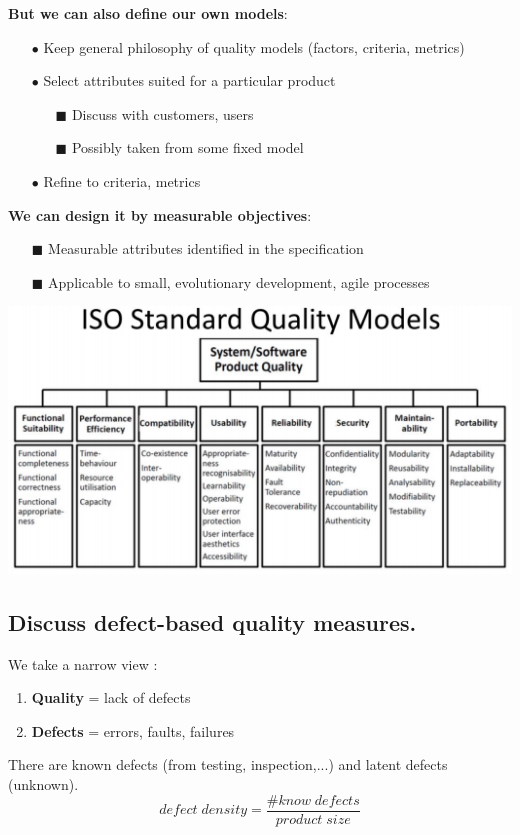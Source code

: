 \documentclass{article}
\begin{document}
\noindent \textbf{But we can also define our own models}:
\begin{itemize}
    \item [$\bullet$]Keep general philosophy of quality models (factors, criteria, metrics)
    \item [$\bullet$]Select attributes suited for a particular product
    \begin{itemize}
        \item [$\blacksquare$]Discuss with customers, users
        \item [$\blacksquare$]Possibly taken from some fixed model
    \end{itemize}
    \item [$\bullet$]Refine to criteria, metrics\\

\end{itemize}
\textbf{We can design it by measurable objectives}:
\begin{itemize}
        \item [$\blacksquare$]Measurable attributes identified in the specification
        \item [$\blacksquare$]Applicable to
small,
evolutionary development,
agile
processes
\end{itemize}
\begin{center}
        \includegraphics[scale=0.7]{40.PNG}
\end{center}

\newpage
\subsection{Discuss defect-based quality measures.}
\noindent We take a narrow view : 
\begin{enumerate}
    \item \textbf{Quality} = lack of defects
    \item \textbf{Defects} = errors, faults, failures
\end{enumerate}
There are known defects (from testing, inspection,...) and latent defects (unknown). 
$$defect\;density = \frac{\#know\;defects}{product\;size}$$
\end{document}
